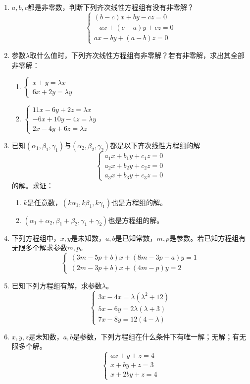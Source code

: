 \begin{enumerate}
\item $a,b,c$都是非零数，判断下列齐次线性方程组有没有非零解？
\[\begin{cases}
    (b-c)x+by-cz=0\\
    -ax+(c-a)y+cz=0\\
    ax-by+(a-b)z=0
\end{cases}\]

\item 参数$\lambda$取什么值时，下列齐次线性方程组有非零解？若有非零解，求出其全部非零解：
\begin{multicols}{2}
\begin{enumerate}
    \item $\begin{cases}
        x+y=\lambda  x\\
        6x+2y=\lambda  y
    \end{cases}$
    \item $\begin{cases}
        11x-6y+2z=\lambda x\\
-6x+10y-4z=\lambda  y\\
2x-4y+6z=\lambda z
    \end{cases}$
\end{enumerate}
\end{multicols}

\item 已知$(\alpha_1,\beta_1,\gamma_1)$与$(\alpha_2,\beta_2,\gamma_2)$都是以下齐次线性方程组的解
\[\begin{cases}
    a_1x+b_1y+c_1z=0\\
    a_2x+b_2y+c_2z=0\\
    a_3x+b_3y+c_3z=0
\end{cases}\]
的解。求证：
\begin{enumerate}
    \item $k$是任意数，$(k\alpha_1,k\beta_1,k\gamma_1)$也是方程组的解。
    \item $(\alpha_1+\alpha_2,\beta_1+\beta_2,\gamma_1+\gamma_2)$也是方程组的解。
\end{enumerate}

\item 下列方程组中，$x,y$是未知数，$a,b$是已知常数，$m,p$是参数。若已知方程组有无限多个解求参数$m,p$。
\[\begin{cases}
    (3m-5p+b) x+ (8m-3p-a) y=1\\
    (2m-3p+b) x+ (4m-p) y=2
\end{cases}\]

\item 已知下列方程组有解，求参数$\lambda$。
\[\begin{cases}
    3x-4x=\lambda   (\lambda^2+12)\\
    5x-6y=2\lambda   (\lambda  +3)\\
    7x-8y=12 (4-\lambda  )
\end{cases}\]
\item $x,y,z$是未知数，$a,b$是参数，下列方程组在什么条件下有唯一解；无解；有无限多个解。
\[\begin{cases}
    ax+y+z=4\\
    x+by+z=3\\
    x+2by+z=4
\end{cases}\]


\end{enumerate}
